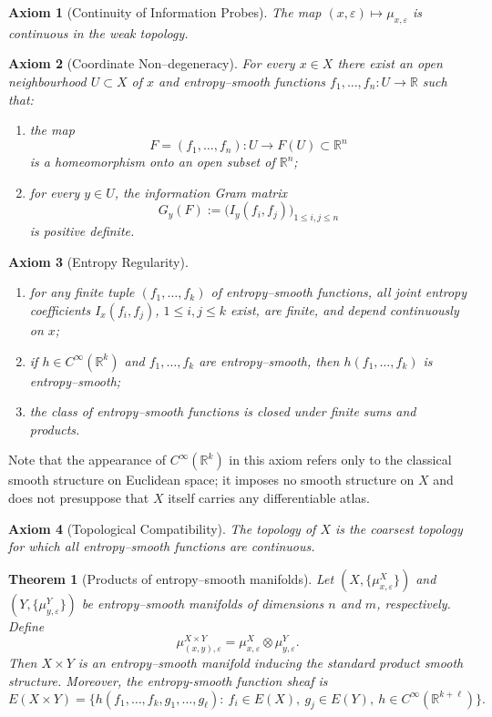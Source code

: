 \documentclass[10pt,a4paper]{amsart}
\newtheorem{axiom}{Axiom}
\newtheorem{theorem}{Theorem}
\begin{document}
\begin{axiom}[Continuity of Information Probes]
\label{axiom:2}
The map $(x,\varepsilon)\mapsto \mu_{x,\varepsilon}$ is continuous in the weak topology.
\end{axiom}

\begin{axiom}[Coordinate Non--degeneracy]
\label{axiom:3}
For every $x\in X$ there exist an open neighbourhood $U\subset X$ of $x$
and \emph{entropy--smooth} functions $f_1,\dots,f_n : U \to \mathbb{R}$ such 
that:
\begin{enumerate}
\item the map 
\[
F = (f_1,\dots,f_n) : U \longrightarrow F(U)\subset\mathbb{R}^n
\]
is a homeomorphism onto an open subset of $\mathbb{R}^n$;
\item for every $y\in U$, the information Gram matrix
\[
G_y(F) := \big(I_y(f_i,f_j)\big)_{1\le i,j\le n}
\]
is positive definite.
\end{enumerate}
\end{axiom}

\begin{axiom}[Entropy Regularity]\label{axiom:4}
\hspace{0.5cm}
\begin{enumerate} 
\item for any finite tuple $(f_1,\dots,f_k)$ of entropy--smooth functions, all \emph{joint entropy coefficients} $I_x(f_i,f_j)$, $1\leq i,j\leq k$ exist, are finite, and depend continuously on $x$;
\item if $h\in C^\infty(\mathbb{R}^k)$ and $f_1,\dots,f_k$ are entropy--smooth, then $h(f_1,\dots,f_k)$ is entropy--smooth;
\item the class of entropy--smooth functions is closed under finite sums and products.
\end{enumerate}
\end{axiom}
Note that the appearance of $C^\infty(\mathbb{R}^k)$ in this axiom refers only
to the classical smooth structure on Euclidean space; it imposes no smooth
structure on $X$ and does not presuppose that $X$ itself carries any
differentiable atlas.

\begin{axiom}[Topological Compatibility]
\label{axiom:5}
The topology of $X$ is the coarsest topology for which all entropy--smooth functions are continuous.
\end{axiom}

\begin{theorem}[Products of entropy--smooth manifolds]
\label{prop:products}
Let $(X,\{\mu^X_{x,\varepsilon}\})$ and $(Y,\{\mu^Y_{y,\varepsilon}\})$ be
entropy--smooth manifolds of dimensions $n$ and $m$, respectively.  Define
\[
\mu^{X\times Y}_{(x,y),\varepsilon}
= \mu^X_{x,\varepsilon} \otimes \mu^Y_{y,\varepsilon}.
\]
Then $X\times Y$ is an entropy--smooth manifold inducing the standard
product smooth structure.  Moreover, the entropy-smooth function sheaf is 
\[
 E(X\times Y)
=
\bigl\{
h(f_1,\dots,f_k,g_1,\dots,g_\ell)
:\ f_i\in  E(X),\ g_j\in E(Y),\
h\in C^\infty(\mathbb{R}^{k+\ell})
\bigr\}.
\]
\end{theorem}
\end{document}
